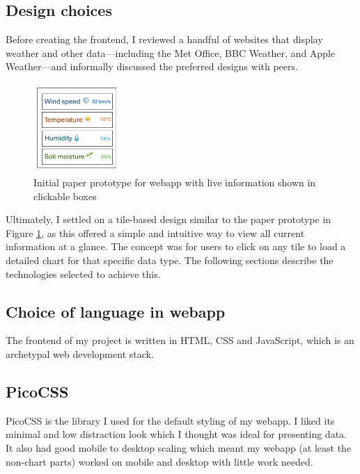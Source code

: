 \subsection{Design choices}

Before creating the frontend, I reviewed a handful of websites that display
weather and other data—including the Met Office, BBC Weather, and Apple
Weather—and informally discussed the preferred designs with peers.

\begin{figure}[H]
    \centering
    \includegraphics[width=0.3\textwidth]{contents/part-3/fig3/paper-prototype.png}
    \caption{Initial paper prototype for webapp with live information shown in clickable boxes}
    \label{fig:paper-prototype}
\end{figure}

Ultimately, I settled on a tile-based design similar to the paper prototype in
Figure \ref{fig:paper-prototype}, as this offered a simple and intuitive way to
view all current information at a glance. The concept was for users to click on
any tile to load a detailed chart for that specific data type. The following
sections describe the technologies selected to achieve this.

\subsection{Choice of language in webapp}

The frontend of my project is written in HTML, CSS and JavaScript, which is an
archetypal web development stack.

\subsection{PicoCSS}

PicoCSS is the library I used for the default styling of my webapp. I liked its
minimal and low distraction look which I thought was ideal for presenting data.
It also had good mobile to desktop scaling which meant my webapp (at least the
non-chart parts) worked on mobile and desktop with little work needed.


